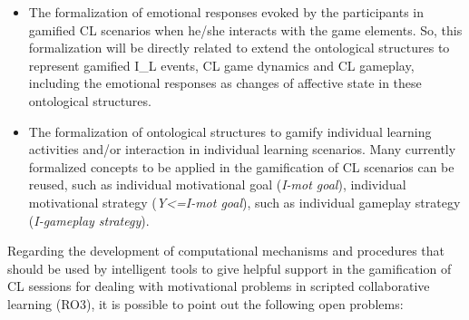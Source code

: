 \begin{itemize}
\item The formalization of emotional responses evoked by the participants in gamified CL scenarios when he/she interacts with the game elements.
So, this formalization will be directly related to extend the ontological structures to represent gamified I\_L events, CL game dynamics and CL gameplay, including the emotional responses as changes of affective state in these ontological structures.
\item The formalization of ontological structures to gamify individual learning activities and/or interaction in individual learning scenarios.
Many currently formalized concepts to be applied in the gamification of CL scenarios can be reused, such as individual motivational goal (\emph{I-mot goal}), individual motivational strategy (\emph{Y<=I-mot goal}), such as individual gameplay strategy (\emph{I-gameplay strategy}).
\end{itemize}

Regarding the development of computational mechanisms and procedures that should be used by intelligent tools to give helpful support in the gamification of CL sessions for dealing with motivational problems in scripted collaborative learning (RO3), it is possible to point out the following open problems:

